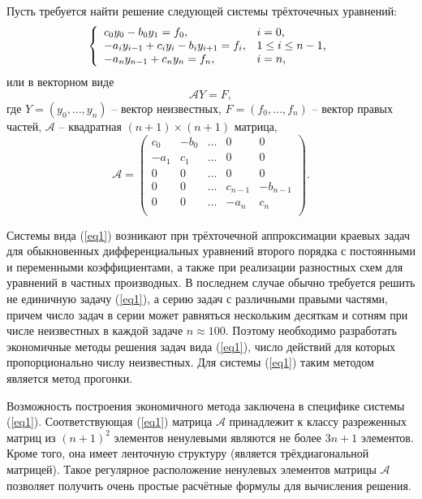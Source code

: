 \documentclass[
11pt,
master, %
subf, %
href, %
colorlinks=true, %
times, %
]{disser}
\begin{document}
Пусть требуется найти решение следующей системы трёхточечных уравнений:
\begin{equation}\label{eq1}
\left\{
  \begin{array}{ll}
    c_0 y_0 - b_0 y_1 = f_0, & \hbox{$i = 0$,} \\
    -a_i y_{i-1} + c_i y_i - b_i y_{i+1} = f_i, & \hbox{$1 \leq i \leq n - 1$,} \\
    -a_n y_{n-1} + c_n y_n = f_n, & \hbox{$i = n$,}
  \end{array}
\right.
\end{equation}
или в векторном виде
$$\mathcal{A}Y = F,$$
где $Y = (y_0,\ldots,y_n)$ -- вектор неизвестных, $F = (f_0,\ldots,f_n)$ -- вектор правых частей, $\mathcal{A}$ -- квадратная $(n+1) \times (n+1)$ матрица,
$$\mathcal{A} = \left(
  \begin{array}{ccccc}
    c_0 & -b_0 & \ldots & 0 & 0 \\
    -a_1 & c_1 & \ldots & 0 & 0 \\
    0 & 0 & \ldots & 0 & 0 \\
    0 & 0 & \ldots & c_{n-1} & -b_{n-1} \\
    0 & 0 & \ldots & -a_n & c_n \\
  \end{array}
\right).$$

Системы вида (\ref{eq1}) возникают при трёхточечной аппроксимации краевых задач для обыкновенных дифференциальных уравнений второго порядка с постоянными и переменными коэффициентами, а также при реализации разностных схем для уравнений в частных производных. В последнем случае обычно требуется решить не единичную задачу (\ref{eq1}), а серию задач с различными правыми частями, причем число задач в серии может равняться нескольким десяткам и сотням при числе неизвестных в каждой задаче $n \approx 100$. Поэтому необходимо разработать экономичные методы решения задач вида (\ref{eq1}), число действий для которых пропорционально числу неизвестных. Для системы (\ref{eq1}) таким методом является метод прогонки.

Возможность построения экономичного метода заключена в специфике системы (\ref{eq1}). Соответствующая (\ref{eq1}) матрица $\mathcal{A}$ принадлежит к классу разреженных матриц из $(n+1)^2$ элементов ненулевыми являются не более $3n + 1$ элементов. Кроме того, она имеет ленточную структуру (является трёхдиагональной матрицей). Такое регулярное расположение ненулевых элементов матрицы $\mathcal{A}$ позволяет получить очень простые расчётные формулы для вычисления решения.
\end{document}
